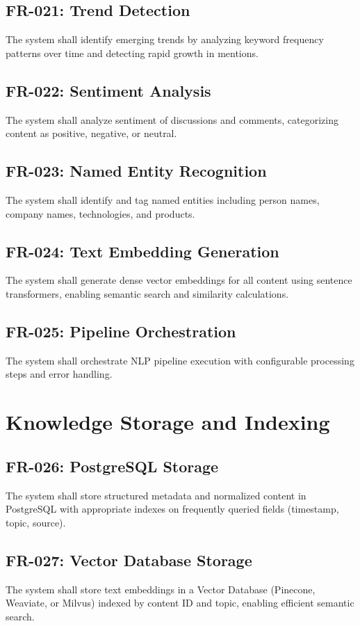 \documentclass{report}
\begin{document}
\subsection{FR-021: Trend Detection}
The system shall identify emerging trends by analyzing keyword frequency patterns over time and detecting rapid growth in mentions.

\subsection{FR-022: Sentiment Analysis}
The system shall analyze sentiment of discussions and comments, categorizing content as positive, negative, or neutral.

\subsection{FR-023: Named Entity Recognition}
The system shall identify and tag named entities including person names, company names, technologies, and products.

\subsection{FR-024: Text Embedding Generation}
The system shall generate dense vector embeddings for all content using sentence transformers, enabling semantic search and similarity calculations.

\subsection{FR-025: Pipeline Orchestration}
The system shall orchestrate NLP pipeline execution with configurable processing steps and error handling.

\section{Knowledge Storage and Indexing}

\subsection{FR-026: PostgreSQL Storage}
The system shall store structured metadata and normalized content in PostgreSQL with appropriate indexes on frequently queried fields (timestamp, topic, source).

\subsection{FR-027: Vector Database Storage}
The system shall store text embeddings in a Vector Database (Pinecone, Weaviate, or Milvus) indexed by content ID and topic, enabling efficient semantic search.
\end{document}
